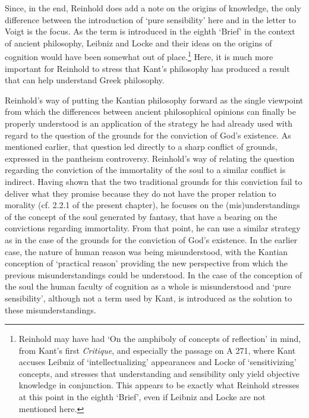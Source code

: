 Since, in the end, Reinhold does add a note on the origins of knowledge, the only difference between the introduction of `pure sensibility' here and in the letter to Voigt is the focus. As the term is introduced in the eighth `Brief' in the context of ancient philosophy, Leibniz and Locke and their ideas on the origins of cognition would have been somewhat out of place.\footnote{ Reinhold may have had `On the amphiboly of concepts of reflection' in mind, from Kant's first \textit{Critique}, and especially the passage on A 271, where Kant accuses Leibniz of `intellectualizing' appearances and Locke of `sensitivizing' concepts, and stresses that understanding and sensibility only yield objective knowledge in conjunction. This appears to be exactly what Reinhold stresses at this point in the eighth `Brief', even if Leibniz and Locke are not mentioned here. } Here, it is much more important for Reinhold to stress that Kant's philosophy has produced a result that can help understand Greek philosophy. 

 Reinhold's way of putting the Kantian philosophy forward as the single viewpoint from which the differences between ancient philosophical opinions can finally be properly understood is an application of the strategy he had already used with regard to the question of the grounds for the conviction of God's existence. As mentioned earlier, that question led directly to a sharp conflict of grounds, expressed in the pantheism controversy. Reinhold's way of relating the question regarding the conviction of the immortality of the soul to a similar conflict is indirect. Having shown that the two traditional grounds for this conviction fail to deliver what they promise because they do not have the proper relation to morality (cf. 2.2.1 of the present chapter), he focuses on the (mis)understandings of the concept of the soul generated by fantasy, that have a bearing on the convictions regarding immortality. From that point, he can use a similar strategy as in the case of the grounds for the conviction of God's existence. In the earlier case, the nature of human reason was being misunderstood, with the Kantian conception of `practical reason' providing the new perspective from which the previous misunderstandings could be understood. In the case of the conception of the soul the human faculty of cognition as a whole is misunderstood and `pure sensibility', although not a term used by Kant, is introduced as the solution to these misunderstandings. 

